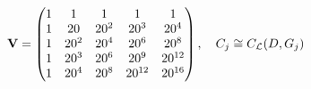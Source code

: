 \documentclass[preview]{standalone}
\begin{document}
\begin{align*}
\special{dvisvgm:raw <g id='unique000'>}\mathbf{V}=\begin{pmatrix} 1 & 1 & 1 & 1 & 1 \\ 1 & 20 & 20^2 & 20^3 & 20^4 \\ 1 & 20^2 & 20^4 & 20^6 & 20^8 \\ 1 & 20^3 & 20^6 & 20^9 & 20^{12} \\ 1 & 20^4 & 20^8 & 20^{12} & 20^{16} \end{pmatrix},\quad \special{dvisvgm:raw </g>}\special{dvisvgm:raw <g id='unique001'>}C_j \special{dvisvgm:raw </g>}\special{dvisvgm:raw <g id='unique002'>}\cong \special{dvisvgm:raw </g>}\special{dvisvgm:raw <g id='unique003'>}C_{\mathcal{L}}(D,G_j)\special{dvisvgm:raw </g>}
\end{align*}
\end{document}
